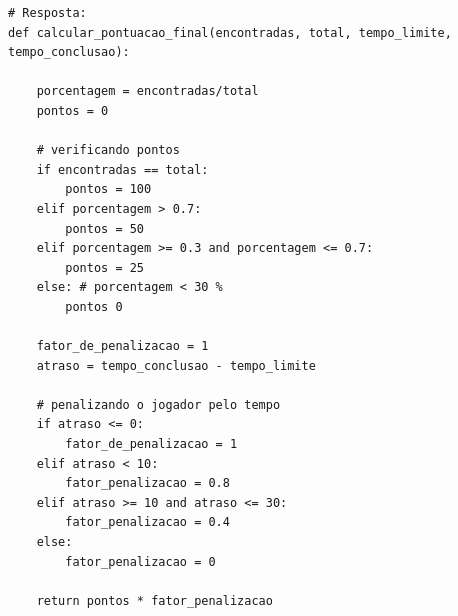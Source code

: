 \ifmostrarGabarito
\begin{verbatim}
# Resposta:
def calcular_pontuacao_final(encontradas, total, tempo_limite, tempo_conclusao):

    porcentagem = encontradas/total
    pontos = 0
    
    # verificando pontos
    if encontradas == total:
        pontos = 100
    elif porcentagem > 0.7:
        pontos = 50
    elif porcentagem >= 0.3 and porcentagem <= 0.7:
        pontos = 25
    else: # porcentagem < 30 %
        pontos 0

    fator_de_penalizacao = 1
    atraso = tempo_conclusao - tempo_limite

    # penalizando o jogador pelo tempo
    if atraso <= 0:
        fator_de_penalizacao = 1
    elif atraso < 10:
        fator_penalizacao = 0.8
    elif atraso >= 10 and atraso <= 30:
        fator_penalizacao = 0.4
    else:
        fator_penalizacao = 0

    return pontos * fator_penalizacao
\end{verbatim}
\fi
